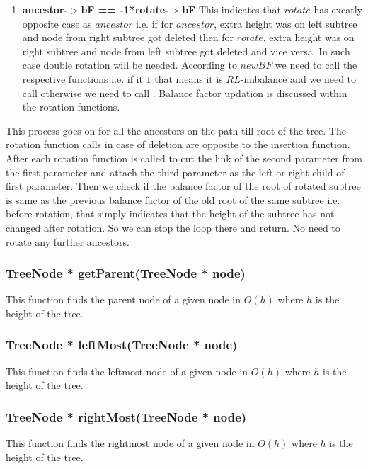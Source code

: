 \documentclass{article}
\begin{document}
\begin{enumerate}
\begin{enumerate}
\item \textbf{ancestor-$>$bF == -1*rotate-$>$bF}\newline
This indicates that $rotate$ has excatly opposite case as $ancestor$ i.e. if for $ancestor$, extra height was on left subtree and node from right subtree got deleted then for $rotate$, extra height was on right subtree and node from left subtree got deleted and vice versa. In such case double rotation will be needed. According to $newBF$ we need to call the respective functions i.e. if it $1$ that means it is $RL$-imbalance and we need to call  otherwise we need to call . Balance factor updation is discussed within the rotation functions.
\end{enumerate}
This process goes on for all the ancestors on the path till root of the tree. The rotation function calls in case of deletion are opposite to the insertion function. After each rotation  function is called to cut the link of the second parameter from the first parameter and attach the third parameter as the left or right child of first parameter. Then we check if the balance factor of the root of rotated subtree is same as the previous balance factor of the old root of the same subtree i.e. before rotation, that simply indicates that the height of the subtree has not changed after rotation. So we can stop the loop there and return. No need to rotate any further ancestors.
\end{enumerate}

\subsubsection{TreeNode * getParent(TreeNode * node)}
This function finds the parent node of a given node in $O(h)$ where $h$ is the height of the tree.

\subsubsection{TreeNode * leftMost(TreeNode * node)}
This function finds the leftmost node of a given node in $O(h)$ where $h$ is the height of the tree.

\subsubsection{TreeNode * rightMost(TreeNode * node)}
This function finds the rightmost node of a given node in $O(h)$ where $h$ is the height of the tree.
\end{document}
